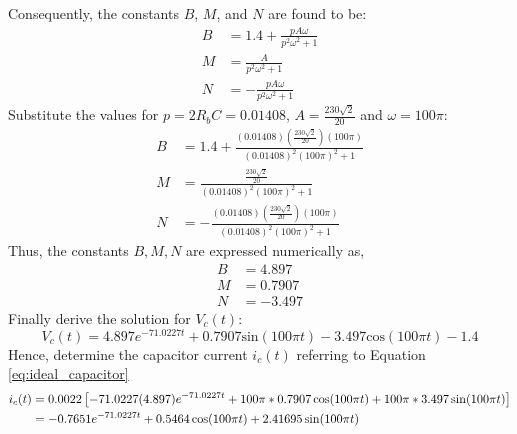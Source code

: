 Consequently, the constants $B$, $M$, and $N$ are found to be:
\begin{align}
B &= 1.4 + \frac{pA\omega}{p^2\omega^2 + 1}\\
M &= \frac{A}{p^2\omega^2 + 1}\\
N &= -\frac{pA\omega}{p^2\omega^2 + 1}
\end{align}
Substitute the values for $p=2R_bC=0.01408$, $A=\frac{230\sqrt{2}}{20}$ and $\omega=100\pi$:
\begin{align}
	B &= 1.4 + \frac{(0.01408)(\frac{230\sqrt{2}}{20})(100\pi)}{(0.01408)^2(100\pi)^2 + 1}\\
	M &= \frac{\frac{230\sqrt{2}}{20}}{(0.01408)^2(100\pi)^2 + 1}\\
	N &= -\frac{(0.01408)(\frac{230\sqrt{2}}{20})(100\pi)}{(0.01408)^2(100\pi)^2 + 1}
\end{align}
Thus, the constants $B, M, N$ are expressed numerically as,
\begin{align}
	B &= 4.897 \\
	M &= 0.7907 \\
	N &= -3.497
\end{align}
Finally derive the solution for $V_c(t)$:
\begin{equation}
	V_c(t) = 4.897e^{-71.0227t} + 0.7907\text{sin}(100\pi t) -3.497\text{cos}(100\pi t) - 1.4
	\label{eq:capacitor_voltage}
\end{equation}
Hence, determine the capacitor current $i_c(t)$ referring to Equation \ref{eq:ideal_capacitor}
\begin{equation}
	\begin{split}
		i_c(t) &= 0.0022\left[-71.0227(4.897)e^{-71.0227t} + 100\pi*0.7907\cos(100\pi t) + 100\pi*3.497\sin(100\pi t) \right] \\
			   &=-0.7651e^{-71.0227t} + 0.5464\cos(100\pi t) + 2.41695\sin(100\pi t)
	\end{split}
\end{equation}

